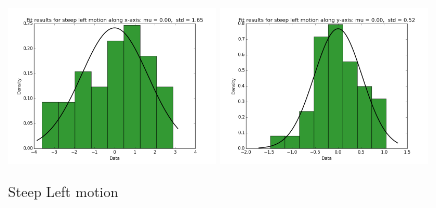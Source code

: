 \documentclass[10pt]{scrartcl}
\begin{document}
\begin{figure}[H]
\centering
\caption{Steep Left motion}
\label{fig:15}
\includegraphics[width=0.49\textwidth ]{images/pca_steep_left_x_data}
\includegraphics[width=0.49\textwidth]{images/pca_steep_left_y_data}
\end{figure}
\end{document}
